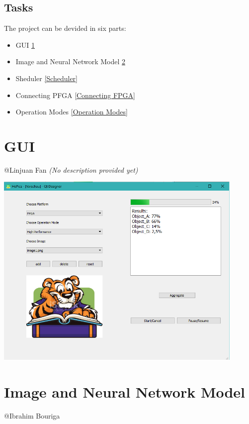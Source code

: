 \documentclass[parskip=full]{scrartcl}
\newcommand\tab[1][1cm]{\hspace*{#1}}
\begin{document}
	\subsection{Tasks}
	\tab The project can be devided in six parts:
	\tab \begin{itemize}
	\item GUI \ref{GUI}
	\item Image and Neural Network Model  \ref{Image and Neural Network Model}
	\item Sheduler \ref{Scheduler}
	\item Connecting PFGA \ref{Connecting FPGA}
	\item Operation Modes  \ref{Operation Modes}
	\end{itemize}
	
\section{GUI} \label{GUI}
	@Linjuan Fan \textit{(No description provided yet)}
	\begin{center}
		\includegraphics[width=0.9\textwidth]{NewMainWindow}
	\end{center}


\pagebreak

\section {Image and Neural Network Model} \label{Image and Neural Network Model}
	@Ibrahim Bouriga
	
\end{document}
